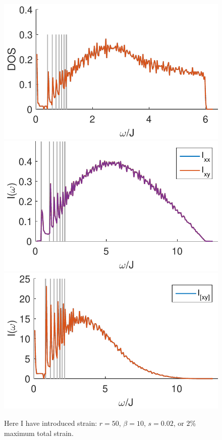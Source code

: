 \documentclass[reprint,amsmath,amssymb,aps,prl,groupedaddress,nofootinbib,superscriptaddress]{revtex4-1}
\newcommand{\1}{\mathds{1}}
\begin{document}
\begin{figure}
	\centering
	\includegraphics[width=0.9\linewidth]{stretch_DOS_rmax_50_b_10_c_20_p_0-eps-converted-to.pdf} 
	\includegraphics[width=0.9\linewidth]{stretch_I2_rmax_50_b_10_c_20_p_0-eps-converted-to.pdf} 
	\includegraphics[width=0.9\linewidth]{stretch_I3_rmax_50_b_10_c_20_p_0-eps-converted-to.pdf}
	\caption{Here I have introduced strain: $r=50$, $\beta=10$, $s=0.02$, or $2$\% maximum total strain. }%
	\label{fig:stretch3}
\end{figure}
\end{document}
